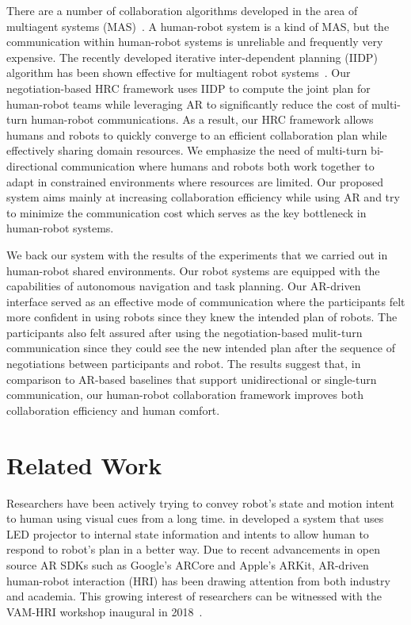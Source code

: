 \documentclass{article}
\begin{document}
There are a number of collaboration algorithms developed in the area of multiagent systems (MAS)~\cite{wooldridge2009introduction}. 
A human-robot system is a kind of MAS, but the communication within human-robot systems is unreliable and frequently very expensive. 
The recently developed iterative inter-dependent planning (IIDP) algorithm has been shown effective for multiagent robot systems~\cite{zhang2017multirobot}. 
Our negotiation-based HRC framework uses IIDP to compute the joint plan for human-robot teams while leveraging AR to significantly reduce the cost of multi-turn human-robot communications. 
As a result, our HRC framework allows humans and robots to quickly converge to an efficient collaboration plan while effectively sharing domain resources. 
We emphasize the need of multi-turn bi-directional communication where humans and robots both work together to adapt in constrained environments where resources are limited. 
Our proposed system aims mainly at increasing collaboration efficiency while using AR and try to minimize the communication cost which serves as the key bottleneck in human-robot systems.

We back our system with the results of the experiments that we carried out in human-robot shared environments. 
Our robot systems are equipped with the capabilities of autonomous navigation and task planning. 
Our AR-driven interface served as an effective mode of communication where the participants felt more confident in using robots since they knew the intended plan of robots. 
The participants also felt assured after using the negotiation-based mulit-turn communication since they could see the new intended plan after the sequence of negotiations between participants and robot. 
The results suggest that, in comparison to AR-based baselines that support unidirectional or single-turn communication, our human-robot collaboration framework improves both collaboration efficiency and human comfort. 

\section{Related Work}

Researchers have been actively trying to convey robot's state and motion intent to human using visual cues from a long time. \citeauthor{chadalavada2015s} in \citeyear{chadalavada2015s} developed a system that uses LED projector to internal state information and intents to allow human to respond to robot's plan in a better way.
Due to recent advancements in open source AR SDKs such as Google's ARCore and Apple's ARKit, AR-driven human-robot interaction (HRI) has been drawing attention from both industry and academia.  
This growing interest of researchers can be witnessed with the VAM-HRI workshop inaugural in 2018~\cite{williams2018virtual}. 
\end{document}
